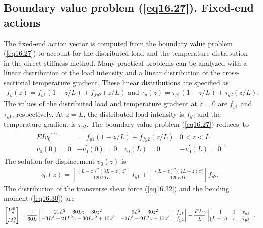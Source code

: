 \documentclass{AeroStructure-ERJohnson}
\begin{document}
\subsection{ Boundary value problem (\ref{eq16.27}). Fixed-end actions}\label{sec16.2.2}

The fixed-end action vector is computed from the boundary value problem (\ref{eq16.27}) to account for the distributed load and the temperature distribution in the direct stiffness method. Many practical problems can be analyzed with a linear distribution of the load intensity and a linear distribution of the cross-sectional temperature gradient. These linear distributions are specified as
\begin{align}\label{eq16.50}
f_{y}(z)=f_{y 1}(1-z / L)+f_{f y 2}(z / L)\mbox{ and }\tau_{y}(z)=\tau_{y 1}(1-z / L)+\tau_{y 2}(z / L).
\end{align}
The values of the distributed load and temperature gradient at $z = 0$ are $f_{y 1}$ and $\tau_{y 1}$, respectively. At $z = \textit{L}$, the distributed load intensity is $f_{y 2}$ and the temperature gradient is $\tau_{y 2}$. The boundary value problem (\ref{eq16.27}) reduces~to
\begin{align}\label{eq16.51}
\begin{array}{clc}E I v_{0}{}^{\prime \prime \prime\prime} & =f_{y 1}(1-z / L)+f_{f y 2}(z / L) & 0<z<L \\v_{0}(0)=0 & -v_{0}^{\prime}(0)=0 \quad v_{0}(L)=0 & -v_{0}^{\prime}(L)=0\end{array}.
\end{align}
The solution for displacement $v_{0}(z)$ is
\begin{align}\label{eq16.52}
v_{0}(z)=\left[\frac{(L-z)^{2}(3 L-z) z^{2}}{120 E I L}\right] f_{y 1}+\left[\frac{(L-z)^{2}(2 L+z) z^{2}}{120 E I L}\right] f_{y 2}.
\end{align}
The distribution of the transverse shear force (\ref{eq16.32}) and the bending moment (\ref{eq16.30}) are
\begin{align}
\left[\begin{array}{@{}c@{}}V_{y}^{0} \\[6pt]M_{x}^{0}\end{array}\right]=\frac{1}{60 L}\left[\begin{array}{@{}cc@{}}21 L^{2}-60 L z+30 z^{2} & 9 L^{2}-30 z^{2} \\-3 L^{3}+21 L^{2} z-30 L z^{2}+10 z^{3} & -2 L^{3}+9 L^{2} z-10 z^{3}\end{array}\right]\left[\begin{array}{@{}l@{}}f_{y 1} \\f_{y 2}\end{array}\right]-\frac{E I \alpha}{L}\left[\begin{array}{@{}cc@{}}-1 & 1 \\(L-z) & z\end{array}\right]\left[\begin{array}{@{}l@{}}\tau_{y 1} \\\tau_{y 2}\end{array}\right].\label{eq16.53}
\end{align}
\end{document}
